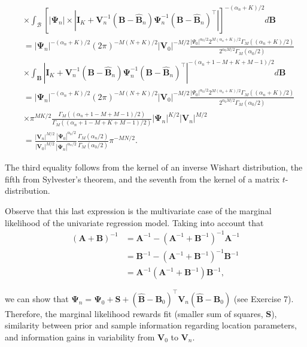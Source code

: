 \begin{align*}
	&\times \int_{\mathcal{B}}\left[|{\bm{\Psi}}_n|\times |{\bm{I}}_{K}+{\bm{V}}_n^{-1}({\bm{B}}-\widehat{\bm{B}}_n){\bm{\Psi}}_n^{-1}({\bm{B}}-\widehat{\bm{B}}_n)^{\top}|\right]^{-(\alpha_n+K)/2}d{\bm{B}}\\
	&=|{\bm{\Psi}}_n|^{-(\alpha_n+K)/2}(2\pi)^{-M(N+K)/2}\left|{\bm V}_0\right|^{-M/2}\frac{|\Psi_0|^{\alpha_0/2}2^{M(\alpha_n+K)/2}\Gamma_M((\alpha_n+K)/2)}{2^{\alpha_0M/2}\Gamma_M(\alpha_0/2)}\\
	&\times \int_{\mathcal{{\bm{B}}}}\left| {\bm{I}}_{K}+{\bm{V}}_n^{-1}({\bm{B}}-\widehat{\bm{B}}_n){\bm{\Psi}}_n^{-1}({\bm{B}}-\widehat{\bm{B}}_n)^{\top}\right|^{-(\alpha_n+1-M+K+M-1)/2}d{\bm{B}}\\
	&=|{\bm{\Psi}}_n|^{-(\alpha_n+K)/2}(2\pi)^{-M(N+K)/2}\left|{\bm V}_0\right|^{-M/2}\frac{|\Psi_0|^{\alpha_0/2}2^{M(\alpha_n+K)/2}\Gamma_M((\alpha_n+K)/2)}{2^{\alpha_0M/2}\Gamma_M(\alpha_0/2)}\\
	&\times \pi^{MK/2}\frac{\Gamma_M((\alpha_n+1-M+M-1)/2)}{\Gamma_M((\alpha_n+1-M+K+M-1)/2)}|{\bm{\Psi}}_n|^{K/2}|{\bm{V}}_n|^{M/2}\\
	&=\frac{|{\bm{V}}_n|^{M/2}}{|{\bm{V}}_0|^{M/2}}\frac{|{\bm{\Psi}}_0|^{\alpha_0/2}}{|{\bm{\Psi}}_n|^{\alpha_n/2}}\frac{\Gamma_M(\alpha_n/2)}{\Gamma_M(\alpha_0/2)}\pi^{-MN/2}.  
\end{align*}

The third equality follows from the kernel of an inverse Wishart distribution, the fifth from Sylvester's theorem, and the seventh from the kernel of a matrix $t$-distribution.

Observe that this last expression is the multivariate case of the marginal likelihood of the univariate regression model. Taking into account that 
\begin{align*}
	({\bm{A}}+{\bm{B}})^{-1}&={\bm{A}}^{-1}-({\bm{A}}^{-1}+{\bm{B}}^{-1})^{-1}{\bm{A}}^{-1}\\
	&={\bm{B}}^{-1}-({\bm{A}}^{-1}+{\bm{B}}^{-1})^{-1}{\bm{B}}^{-1}\\
	&={\bm{A}}^{-1}({\bm{A}}^{-1}+{\bm{B}}^{-1}){\bm{B}}^{-1},
\end{align*} 

we can show that ${\bm{\Psi}}_{n}={\bm{\Psi}}_{0}+{\bm{S}}+(\hat{\bm{B}}-{\bm{B}}_{0})^{\top}{\bm{V}}_{n}(\hat{\bm{B}}-{\bm{B}}_{0})$ (see Exercise 7). Therefore, the marginal likelihood rewards fit (smaller sum of squares, ${\bm{S}}$), similarity between prior and sample information regarding location parameters, and information gains in variability from ${\bm{V}}_0$ to ${\bm{V}}_n$.   

